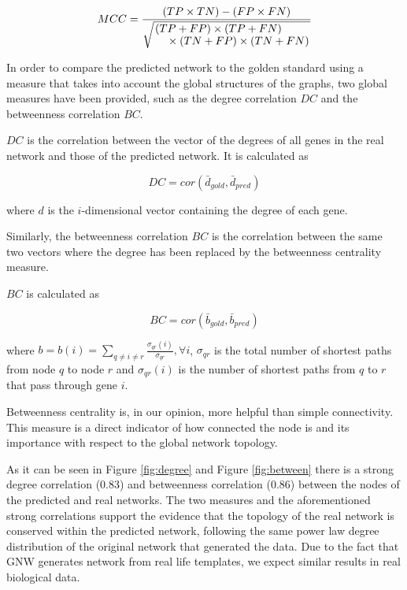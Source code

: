 \begin{equation}
MCC = \frac{(TP \times TN) - (FP \times FN)}{\sqrt{\splitfrac{(TP+FP)\times(TP+FN)}{
\times(TN+FP)\times(TN+FN)} }}
\label{eq:mcc}
\end{equation}

In order to compare the predicted network to the golden standard using a measure that takes into account the global structures of the graphs, two global measures have been provided, such as the degree correlation $DC$ and the betweenness correlation $BC$.
 
$DC$ is the correlation between the vector of the degrees of all genes in the real network and those of the predicted network. It is calculated as 

\begin{equation}
DC = cor(\bar{d}_{gold}, \bar{d}_{pred})
\label{eq:degree}
\end{equation}

where $d$ is the $i$-dimensional vector containing the degree of each gene. 

Similarly, the betweenness correlation $BC$ is the correlation between the same two vectors where the degree has been replaced by the betweenness centrality measure.

$BC$ is calculated as 

\begin{equation}
BC = cor(\bar{b}_{gold}, \bar{b}_{pred}) 
\label{eq:betweenness}
\end{equation}


where $b=b(i)=\sum_{q \ne i \ne r} \frac{\sigma_{qr}(i) } {\sigma_{qr} } , \forall i$, $\sigma_{qr}$ is the total number of shortest paths from node $q$ to node $r$ and $\sigma_{qr}(i)$ is the number of shortest paths from $q$ to $r$ that pass through gene $i$.


Betweenness centrality is, in our opinion, more helpful than simple connectivity. This measure is a direct indicator of how connected the node is and its importance with respect to the global network topology. 

As it can be seen in Figure \ref{fig:degree} and Figure \ref{fig:between} there is a strong degree correlation (0.83) and betweenness correlation (0.86) between the nodes of the predicted and real networks. The two measures and the aforementioned strong correlations support the evidence that the topology of the real network is conserved within the predicted network, following the same power law degree distribution of the original network that generated the data. 
Due to the fact that GNW generates network from real life templates, we expect  similar results in real biological data.


